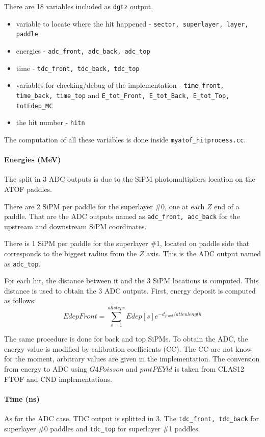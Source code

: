 There are 18 variables included as \texttt{dgtz} output.
\begin{itemize}
	\item variable to locate where the hit happened - \texttt{sector, superlayer, layer, paddle}
	\item energies - \texttt{adc\_front, adc\_back, adc\_top}
	\item time - \texttt{tdc\_front, tdc\_back, tdc\_top}
	\item variables for checking/debug of the implementation - \texttt{time\_front, time\_back, time\_top} and \texttt{E\_tot\_Front, E\_tot\_Back, E\_tot\_Top, totEdep\_MC}
	\item the hit number - \texttt{hitn}
\end{itemize}

The computation of all these variables is done inside \texttt{myatof\_hitprocess.cc}. 

	\paragraph{Energies (MeV)}
	The split in 3 ADC outputs is due to the SiPM photomultipliers location on the ATOF paddles. 
	
	There are 2 SiPM per paddle for the superlayer \#0, one at each $Z$ end of a paddle. That are the ADC outputs named as \texttt{adc\_front, adc\_back} for the upstream and downstream SiPM coordinates.
	
	There is 1 SiPM per paddle for the superlayer \#1, located on paddle side that corresponds to the biggest radius from the $Z$ axis. This is the ADC output named as \texttt{adc\_top}. 
	
	For each hit, the distance between it and the 3 SiPM locations is computed. This distance is used to obtain the 3 ADC outputs. First, energy deposit is computed as follows:
	\begin{equation}
	EdepFront = \sum_{s=1}^{all steps} Edep[s] e^{-d_{front}/attenlength}
	\end{equation}
	
	The same procedure is done for back and top SiPMs.
	To obtain the ADC, the energy value is modified by calibration coefficients (CC). The CC are not know for the moment, arbitrary values are given in the implementation. The conversion from energy to ADC using $G4Poisson$ and $pmtPEYld$ is taken from CLAS12 FTOF and CND implementations. 
	
	\paragraph{Time (ns)}
	As for the ADC case, TDC output is splitted in 3. The \texttt{tdc\_front, tdc\_back} for superlayer \#0 paddles and \texttt{tdc\_top} for superlayer \#1 paddles. 
	
